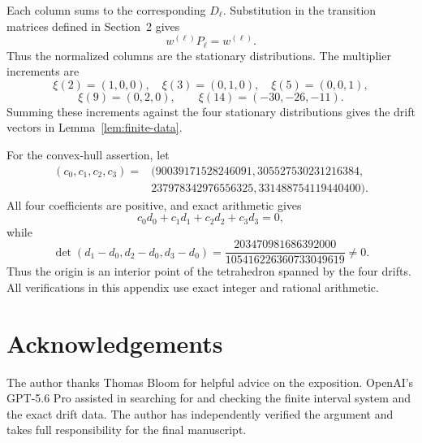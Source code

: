 \documentclass[11pt,a4paper]{amsart}
\begin{document}
Each column sums to the corresponding $D_\ell$. Substitution in the transition matrices defined in Section~2 gives
\[
 w^{(\ell)}P_\ell=w^{(\ell)}.
\]
Thus the normalized columns are the stationary distributions. The multiplier increments are
\[
 \xi(2)=(1,0,0),\quad \xi(3)=(0,1,0),\quad \xi(5)=(0,0,1),
\]
\[
 \xi(9)=(0,2,0),\qquad \xi(14)=(-30,-26,-11).
\]
Summing these increments against the four stationary distributions gives the drift vectors in Lemma~\ref{lem:finite-data}.

For the convex-hull assertion, let
\begin{align*}
(c_0,c_1,c_2,c_3)={}&(
90039171528246091,
305527530231216384,\\
&237978342976556325,
331488754119440400).
\end{align*}
All four coefficients are positive, and exact arithmetic gives
\[
 c_0d_0+c_1d_1+c_2d_2+c_3d_3=0,
\]
while
\[
 \det(d_1-d_0,d_2-d_0,d_3-d_0)
 =\frac{203470981686392000}{105416226360733049619}\ne0.
\]
Thus the origin is an interior point of the tetrahedron spanned by the four drifts. All verifications in this appendix use exact integer and rational arithmetic.

\section*{Acknowledgements}

The author thanks Thomas Bloom for helpful advice on the exposition. OpenAI's GPT-5.6 Pro assisted in searching for and checking the finite interval system and the exact drift data. The author has independently verified the argument and takes full responsibility for the final manuscript.
\end{document}
